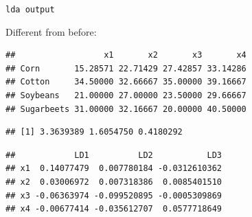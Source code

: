 \documentclass[
  ignorenonframetext,
]{beamer}
\newenvironment{Shaded}{\begin{snugshade}}{\end{snugshade}}
\newcommand{\NormalTok}[1]{#1}
\newcommand{\OperatorTok}[1]{\textcolor[rgb]{0.81,0.36,0.00}{\textbf{#1}}}
\begin{document}
\begin{frame}[fragile]{\texttt{lda\ output}}
\protect\hypertarget{lda-output}{}

Different from before:

\footnotesize

\begin{Shaded}
\end{Shaded}

\begin{verbatim}
##                  x1       x2       x3       x4
## Corn       15.28571 22.71429 27.42857 33.14286
## Cotton     34.50000 32.66667 35.00000 39.16667
## Soybeans   21.00000 27.00000 23.50000 29.66667
## Sugarbeets 31.00000 32.16667 20.00000 40.50000
\end{verbatim}

\begin{Shaded}
\end{Shaded}

\begin{verbatim}
## [1] 3.3639389 1.6054750 0.4180292
\end{verbatim}

\begin{Shaded}
\end{Shaded}

\begin{verbatim}
##            LD1          LD2           LD3
## x1  0.14077479  0.007780184 -0.0312610362
## x2  0.03006972  0.007318386  0.0085401510
## x3 -0.06363974 -0.099520895 -0.0005309869
## x4 -0.00677414 -0.035612707  0.0577718649
\end{verbatim}

\normalsize

\end{frame}
\end{document}
